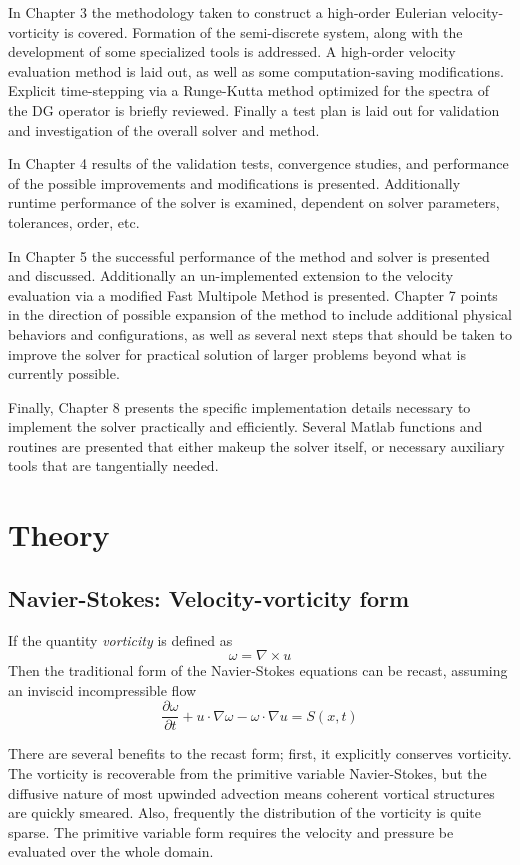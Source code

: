\documentclass[letterpaper,12pt]{report}
\newcommand{\be}{\begin{equation}}
\newcommand{\ben}[1]{\begin{equation}\label{#1}}
\newcommand{\ee}{\end{equation}}
\begin{document}
In Chapter 3 the methodology taken to construct a high-order Eulerian velocity-vorticity is covered. Formation of the semi-discrete system, along with the development of some specialized tools is addressed. A high-order velocity evaluation method is laid out, as well as some computation-saving modifications. Explicit time-stepping via a Runge-Kutta method optimized for the spectra of the DG operator is briefly reviewed. Finally a test plan is laid out for validation and investigation of the overall solver and method. 

In Chapter 4 results of the validation tests, convergence studies, and performance of the possible improvements and modifications is presented. Additionally runtime performance of the solver is examined, dependent on solver parameters, tolerances, order, etc.

In Chapter 5 the successful performance of the method and solver is presented and discussed. Additionally an un-implemented extension to the velocity evaluation via a modified Fast Multipole Method is presented. Chapter 7 points in the direction of possible expansion of the method to include additional physical behaviors and configurations, as well as several next steps that should be taken to improve the solver for practical solution of larger problems beyond what is currently possible.

Finally, Chapter 8 presents the specific implementation details necessary to implement the solver practically and efficiently. Several Matlab functions and routines are presented that either makeup the solver itself, or necessary auxiliary tools that are tangentially needed.
\chapter{Theory}
\section{Navier-Stokes: Velocity-vorticity form}
If the quantity \textit{vorticity} is defined as
\be \omega = \nabla \times u \ee
Then the traditional form of the Navier-Stokes equations can be recast, assuming an inviscid incompressible flow
\ben{VV3D} \frac{\partial \omega}{\partial t} + u \cdot \nabla \omega - \omega \cdot \nabla u = S(x,t)\ee

There are several benefits to the recast form; first, it explicitly conserves vorticity. The vorticity is recoverable from the primitive variable Navier-Stokes, but the diffusive nature of most upwinded advection means coherent vortical structures are quickly smeared. Also, frequently the distribution of the vorticity is quite sparse. The primitive variable form requires the velocity and pressure be evaluated over the whole domain.
\end{document}
